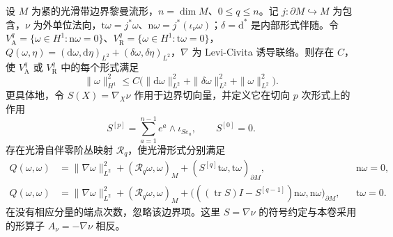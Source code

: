 \begin{lemma}\label{g3:lem:hodge-boundary-energy-estimate}
	设 \(M\) 为紧的光滑带边界黎曼流形，\(n=\dim M\)、\(0\le q\le n\)。记 \(j:\partial M\hookrightarrow M\) 为包含，\(\nu\) 为外单位法向，\(\mathrm t\omega=j^*\omega\)、\(\mathrm n\omega=j^*(\iota_\nu\omega)\)；\(\delta=\mathrm d^*\) 是内部形式伴随。令 \(V_{\mathrm A}^q=\{\omega\in H^1:\mathrm n\omega=0\}\)、\(V_{\mathrm R}^q=\{\omega\in H^1:\mathrm t\omega=0\}\)，\(Q(\omega,\eta)=(\mathrm d\omega,\mathrm d\eta)_{L^2}+(\delta\omega,\delta\eta)_{L^2}\)，\(\nabla\) 为 Levi-Civita 诱导联络。则存在 \(C\)，使 \(V_{\mathrm A}^q\) 或 \(V_{\mathrm R}^q\) 中的每个形式满足
	\begin{equation}\label{g3:eq:hodge-gaffney-estimate}
		\|\omega\|_{H^1}^2
		\le C\bigl(\|\mathrm d\omega\|_{L^2}^2
		+\|\delta\omega\|_{L^2}^2+\|\omega\|_{L^2}^2\bigr).
	\end{equation}
	更具体地，令 \(S(X)=\nabla_X\nu\) 作用于边界切向量，并定义它在切向 \(p\) 次形式上的作用
	\[
		S^{[p]}=\sum_{a=1}^{n-1}e^a\wedge\iota_{S e_a},
		\qquad S^{[0]}=0.
	\]
	存在光滑自伴零阶丛映射 \(\mathcal R_q\)，使光滑形式分别满足
	\begin{align}
		Q(\omega,\omega)
		&=\|\nabla\omega\|_{L^2}^2+(\mathcal R_q\omega,\omega)_M
		+(S^{[q]}\mathrm t\omega,\mathrm t\omega)_{\partial M},
		&&\mathrm n\omega=0,\label{g3:eq:hodge-energy-absolute}\\
		Q(\omega,\omega)
		&=\|\nabla\omega\|_{L^2}^2+(\mathcal R_q\omega,\omega)_M
		+\bigl(((\operatorname{tr}S)I-S^{[q-1]})\mathrm n\omega,
		\mathrm n\omega\bigr)_{\partial M},
		&&\mathrm t\omega=0.\label{g3:eq:hodge-energy-relative}
	\end{align}
	在没有相应分量的端点次数，忽略该边界项。这里 \(S=\nabla\nu\) 的符号约定与本卷采用的形算子 \(A_\nu=-\nabla\nu\) 相反。
\end{lemma}
